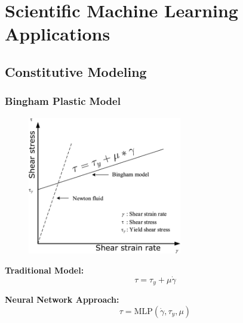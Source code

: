 \documentclass{beamer}
\begin{document}
\section{Scientific Machine Learning Applications}

\subsection{Constitutive Modeling}
\begin{frame}
\frametitle{Bingham Plastic Model}
\begin{figure}
\includegraphics[width=0.6\textwidth]{bingham.png}
\end{figure}

\textbf{Traditional Model:}
\begin{equation}
\tau = \tau_y + \mu\dot{\gamma}
\end{equation}

\textbf{Neural Network Approach:}
\begin{equation}
\tau = \text{MLP}(\dot{\gamma}, \tau_y, \mu)
\end{equation}
\end{frame}
\end{document}
